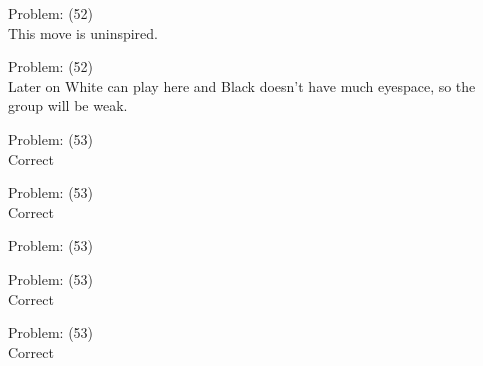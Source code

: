 \documentclass[11pt]{article}
\begin{document}
\begin{minipage}[t]{0.5\textwidth}
  {\centering
  
  Problem: (52)\\
  This move is uninspired.\\
  }
\end{minipage}
\begin{minipage}[t]{0.5\textwidth}
  {\centering
  
  Problem: (52)\\
  Later on White can play here and Black doesn't have much eyespace, so the group will be weak.\\
  }
\end{minipage}
\begin{minipage}[t]{0.5\textwidth}
  {\centering
  
  Problem: (53)\\
  Correct\\
  }
\end{minipage}
\begin{minipage}[t]{0.5\textwidth}
  {\centering
  
  Problem: (53)\\
  Correct\\
  }
\end{minipage}
\begin{minipage}[t]{0.5\textwidth}
  {\centering
  
  Problem: (53)\\
  
  }
\end{minipage}
\begin{minipage}[t]{0.5\textwidth}
  {\centering
  
  Problem: (53)\\
  Correct\\
  }
\end{minipage}
\begin{minipage}[t]{0.5\textwidth}
  {\centering
  
  Problem: (53)\\
  Correct\\
  }
\end{minipage}
\end{document}
